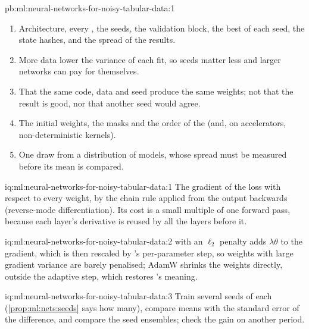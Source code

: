 \begin{solution}{pb:ml:neural-networks-for-noisy-tabular-data:1}
\begin{enumerate}
\item Architecture, every , the seeds, the validation block, the best  of each seed, the state hashes,
and the spread of the results.
\item More data lower the variance of each fit, so seeds matter less and larger networks can pay for themselves.
\item That the same code, data and seed produce the same weights; not that the result is good, nor that another seed would
agree.
\item The initial weights, the  masks and the order of the  (and, on accelerators, non-deterministic
kernels).
\item One draw from a distribution of models, whose spread must be measured before its mean is compared.
\end{enumerate}
\end{solution}

\begin{solution}{iq:ml:neural-networks-for-noisy-tabular-data:1}
The gradient of the loss with respect to every weight, by the chain rule applied from the output backwards (reverse-mode
differentiation). Its cost is a small multiple of one forward pass, because each layer's derivative is reused by all the
layers before it.
\end{solution}

\begin{solution}{iq:ml:neural-networks-for-noisy-tabular-data:2}
 with an $\ell_2$ penalty adds $\lambda\theta$ to the gradient, which is then rescaled by 's per-parameter step, so
weights with large gradient variance are barely penalised; AdamW shrinks the weights directly, outside the adaptive step,
which restores 's meaning.
\end{solution}

\begin{solution}{iq:ml:neural-networks-for-noisy-tabular-data:3}
Train several seeds of each (\cref{prop:ml:nets:seeds} says how many), compare means with the standard error of the
difference, and compare the seed ensembles; check the gain on another period.
\end{solution}

